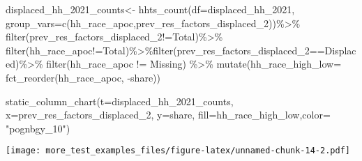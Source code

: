 \documentclass[
]{article}
\newenvironment{Shaded}{\begin{snugshade}}{\end{snugshade}}
\newcommand{\AttributeTok}[1]{\textcolor[rgb]{0.77,0.63,0.00}{#1}}
\newcommand{\FunctionTok}[1]{\textcolor[rgb]{0.00,0.00,0.00}{#1}}
\newcommand{\NormalTok}[1]{#1}
\newcommand{\OtherTok}[1]{\textcolor[rgb]{0.56,0.35,0.01}{#1}}
\newcommand{\SpecialCharTok}[1]{\textcolor[rgb]{0.00,0.00,0.00}{#1}}
\newcommand{\StringTok}[1]{\textcolor[rgb]{0.31,0.60,0.02}{#1}}
\begin{document}
\begin{Shaded}
\begin{Highlighting}[]
\NormalTok{displaced\_hh\_2021\_counts}\OtherTok{\textless{}{-}} \FunctionTok{hhts\_count}\NormalTok{(}\AttributeTok{df=}\NormalTok{displaced\_hh\_2021, }\AttributeTok{group\_vars=}\FunctionTok{c}\NormalTok{(}\StringTok{\textquotesingle{}hh\_race\_apoc\textquotesingle{}}\NormalTok{,}\StringTok{\textquotesingle{}prev\_res\_factors\_displaced\_2\textquotesingle{}}\NormalTok{))}\SpecialCharTok{\%\textgreater{}\%}
\FunctionTok{filter}\NormalTok{(prev\_res\_factors\_displaced\_2}\SpecialCharTok{!=}\StringTok{\textquotesingle{}Total\textquotesingle{}}\NormalTok{)}\SpecialCharTok{\%\textgreater{}\%}
  \FunctionTok{filter}\NormalTok{(hh\_race\_apoc}\SpecialCharTok{!=}\StringTok{\textquotesingle{}Total\textquotesingle{}}\NormalTok{)}\SpecialCharTok{\%\textgreater{}\%}\FunctionTok{filter}\NormalTok{(prev\_res\_factors\_displaced\_2}\SpecialCharTok{==}\StringTok{\textquotesingle{}Displaced\textquotesingle{}}\NormalTok{)}\SpecialCharTok{\%\textgreater{}\%}
  \FunctionTok{filter}\NormalTok{(hh\_race\_apoc }\SpecialCharTok{!=} \StringTok{\textquotesingle{}Missing\textquotesingle{}}\NormalTok{) }\SpecialCharTok{\%\textgreater{}\%}
  \FunctionTok{mutate}\NormalTok{(}\AttributeTok{hh\_race\_high\_low=} \FunctionTok{fct\_reorder}\NormalTok{(hh\_race\_apoc, }\SpecialCharTok{{-}}\NormalTok{share))}

\FunctionTok{static\_column\_chart}\NormalTok{(}\AttributeTok{t=}\NormalTok{displaced\_hh\_2021\_counts, }\AttributeTok{x=}\StringTok{\textquotesingle{}prev\_res\_factors\_displaced\_2\textquotesingle{}}\NormalTok{, }\AttributeTok{y=}\StringTok{\textquotesingle{}share\textquotesingle{}}\NormalTok{, }\AttributeTok{fill=}\StringTok{\textquotesingle{}hh\_race\_high\_low\textquotesingle{}}\NormalTok{,}\AttributeTok{color=}  \StringTok{"pognbgy\_10"}\NormalTok{)}
\end{Highlighting}
\end{Shaded}

\texttt{[image: more\_test\_examples\_files/figure-latex/unnamed-chunk-14-2.pdf]}
\end{document}
